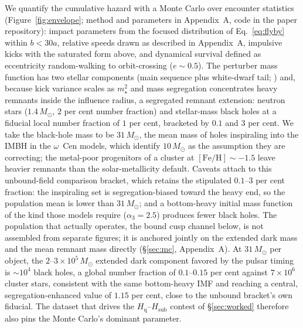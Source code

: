 \documentclass[11pt]{article}
\newcommand{\msun}{\ensuremath{M_\odot}}
\newcommand{\ocen}{\ensuremath{\omega}~Cen}
\newcommand{\Hgas}{\ensuremath{H_{\mathrm{q}}}}
\newcommand{\Hsub}{\ensuremath{H_{\mathrm{sub}}}}
\begin{document}
We quantify the cumulative hazard with a Monte Carlo over encounter statistics (Figure~\ref{fig:envelope}; method and parameters in Appendix~A, code in the paper repository): impact parameters from the focused distribution of Eq.~\ref{eq:flyby} within $b < 30a$, relative speeds drawn as described in Appendix~A, impulsive kicks with the saturated form above, and dynamical survival defined as eccentricity random-walking to orbit-crossing ($e \sim 0.5$). The perturber mass function has two stellar components (main sequence plus white-dwarf tail; \citealt{Haberle2024oMEGACatII}) and, because kick variance scales as $m_{\star}^{2}$ and mass segregation concentrates heavy remnants inside the influence radius, a segregated remnant extension: neutron stars ($1.4\,\msun$, $2$ per cent number fraction) and stellar-mass black holes at a fiducial local number fraction of $1$ per cent, bracketed by $0.1$ and $3$ per cent. We take the black-hole mass to be $31\,\msun$, the mean mass of holes inspiraling into the IMBH in the \citet{GonzalezPrieto2025} \ocen{} models, which identify $10\,\msun$ as the assumption they are correcting; the metal-poor progenitors of a cluster at $\mathrm{[Fe/H]} \sim -1.5$ leave heavier remnants than the solar-metallicity default. Caveats attach to this unbound-field comparison bracket, which retains the stipulated $0.1$--$3$ per cent fraction: the inspiraling set is segregation-biased toward the heavy end, so the population mean is lower than $31\,\msun$; and a bottom-heavy initial mass function of the kind those models require ($\alpha_{3} = 2.5$) produces fewer black holes. The population that actually operates, the bound cusp channel below, is not assembled from separate figures; it is anchored jointly on the extended dark mass and the mean remnant mass directly (\S\ref{sec:mc}, Appendix~A). At $31\,\msun$ per object, the $2$--$3\times10^{5}\,\msun$ extended dark component favored by the pulsar timing \citep{BanaresHernandez2025} is $\sim 10^{4}$ black holes, a global number fraction of $0.1$--$0.15$ per cent against $7\times10^{6}$ cluster stars, consistent with the same bottom-heavy IMF and reaching a central, segregation-enhanced value of $1.15$ per cent, close to the unbound bracket's own fiducial. The dataset that drives the \Hgas--\Hsub{} contest of \S\ref{sec:worked} therefore also pins the Monte Carlo's dominant parameter.
\end{document}
